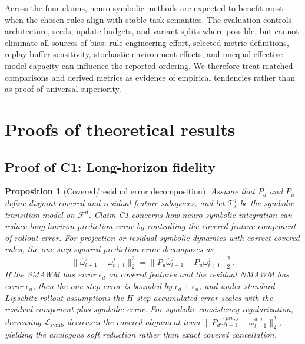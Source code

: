 \documentclass{article}
\theoremstyle{plain}
\newtheorem{proposition}[theorem]{Proposition}
\theoremstyle{definition}
\theoremstyle{remark}
\begin{document}
Across the four claims, neuro-symbolic methods are expected to benefit most when the chosen rules align with stable task semantics. The evaluation controls architecture, seeds, update budgets, and variant splits where possible, but cannot eliminate all sources of bias: rule-engineering effort, selected metric definitions, replay-buffer sensitivity, stochastic environment effects, and unequal effective model capacity can influence the reported ordering. We therefore treat matched comparisons and derived metrics as evidence of empirical tendencies rather than as proof of universal superiority.


\section{Proofs of theoretical results}
\label{app:proofs}

\subsection{Proof of C1: Long-horizon fidelity}
\label{app:proof-c1}

\begin{proposition}[Covered/residual error decomposition]
  Assume that $P_d$ and $P_u$ define disjoint covered and residual feature subspaces, and let $\mathcal{T}^j_s$ be the symbolic transition model on $\mathcal{F}^d$. Claim C1 concerns how neuro-symbolic integration can reduce long-horizon prediction error by controlling the covered-feature component of rollout error. For projection or residual symbolic dynamics with correct covered rules, the one-step squared prediction error decomposes as
  \[
    \|\hat{\omega}^{j}_{t+1}-\omega^{j}_{t+1}\|_2^2
    =
    \|P_u\hat{\omega}^{j}_{t+1}-P_u\omega^{j}_{t+1}\|_2^2 .
  \]
  If the SMAWM has error $\epsilon_d$ on covered features and the residual NMAWM has error $\epsilon_u$, then the one-step error is bounded by $\epsilon_d+\epsilon_u$, and under standard Lipschitz rollout assumptions the $H$-step accumulated error scales with the residual component plus symbolic error. For symbolic consistency regularization, decreasing $\mathcal{L}_{\mathrm{symb}}$ decreases the covered-alignment term $\|P_d\hat{\omega}^{pre,j}_{t+1}-\omega^{d,j}_{t+1}\|_2^2$, yielding the analogous soft reduction rather than exact covered cancellation.
\end{proposition}
\end{document}
